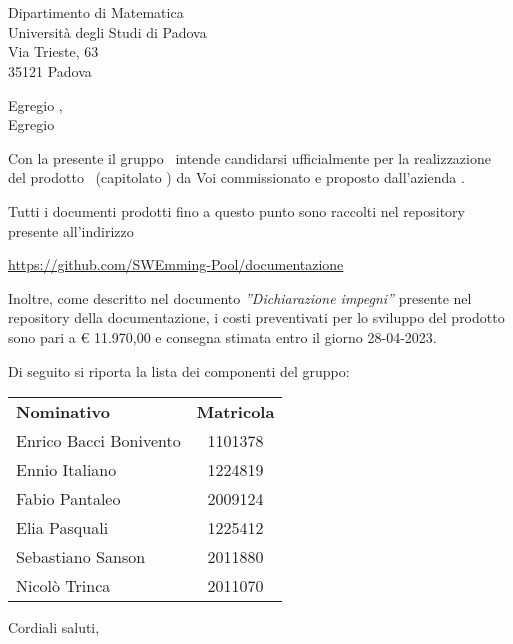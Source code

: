 \documentclass[12pt, boldsubject, italicsignature, noindent]{letteracdp}
\date{}
\begin{document}
\begin{letter}{
    \Vardanega \\
    \Cardin \\
    Dipartimento di Matematica \\
    Università degli Studi di Padova \\
    Via Trieste, 63 \\ 35121 Padova
}

\opening{Egregio \vardanega,\\ Egregio \cardin}

Con la presente il gruppo \groupName\ intende candidarsi ufficialmente per la realizzazione del prodotto \capName\ (capitolato \capCode) da Voi commissionato e proposto dall'azienda \capProposer.

Tutti i documenti prodotti fino a questo punto sono raccolti nel repository presente all'indirizzo 
\begin{center}
    \url{https://github.com/SWEmming-Pool/documentazione}
\end{center}

Inoltre, come descritto nel documento \textit{''Dichiarazione impegni''} presente nel repository della documentazione, i costi preventivati per lo sviluppo del prodotto sono pari a \euro{} 11.970,00 e consegna stimata entro il giorno 28-04-2023.

\pagebreak

Di seguito si riporta la lista dei componenti del gruppo:

\begin{center}
    \begin{tabular}{l|c}
    \textbf{Nominativo} & \textbf{Matricola} \\
    Enrico Bacci Bonivento & 1101378 \\
	Ennio Italiano & 1224819 \\
	Fabio Pantaleo & 2009124 \\     
	Elia Pasquali & 1225412 \\	     
	Sebastiano Sanson & 2011880 \\
    Nicolò Trinca & 2011070
   \end{tabular}
\end{center}

\closing{Cordiali saluti,}

\end{letter}
\end{document}
